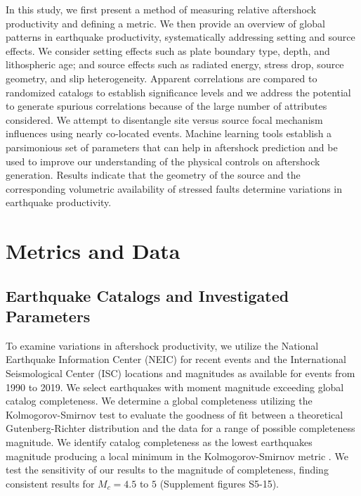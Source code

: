 \documentclass[draft, jgrga]{agujournal2018}
\begin{document}
In this study, we first present a method of measuring relative aftershock productivity and defining a metric. We then provide an overview of global patterns in earthquake productivity, systematically addressing setting and source effects. We consider setting effects such as plate boundary type, depth, and lithospheric age; and source effects such as radiated energy, stress drop, source geometry, and slip heterogeneity. Apparent correlations are compared to randomized catalogs to establish significance levels and we address the potential to generate spurious correlations because of the large number of attributes considered. We attempt to disentangle site versus source focal mechanism influences using nearly co-located events. Machine learning tools establish a parsimonious set of parameters that can help in aftershock prediction and be used to improve our understanding of the physical controls on aftershock generation. Results indicate that the geometry of the source and the corresponding volumetric availability of stressed faults determine variations in earthquake productivity.

\section{Metrics and Data}

\subsection{Earthquake Catalogs and Investigated Parameters}

To examine variations in aftershock productivity, we utilize the National Earthquake Information Center (NEIC) for recent events and the International Seismological Center (ISC) locations and magnitudes as available for events from 1990 to 2019. We select earthquakes with moment magnitude exceeding global catalog completeness. We determine a global completeness utilizing the Kolmogorov-Smirnov test to evaluate the goodness of fit between a theoretical Gutenberg-Richter distribution and the data for a range of possible completeness magnitude. We identify catalog completeness as the lowest earthquakes magnitude producing a local minimum in the Kolmogorov-Smirnov metric \citep[following][]{Clauset2009Power-lawData, Goebel2017WhatExperiments}. We test the sensitivity of our results to the magnitude of
completeness, finding consistent results for $M_c= 4.5$ to $5$ (Supplement figures S5-15).

\end{document}
